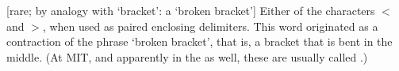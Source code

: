 
[rare; by analogy with `bracket': a `broken bracket'] Either of the characters
$<$ and $>$, when used as paired enclosing delimiters. This word originated as a
contraction of the phrase `broken bracket', that is, a bracket that is bent in
the middle. (At MIT, and apparently in the  as well, these
are usually called .)

